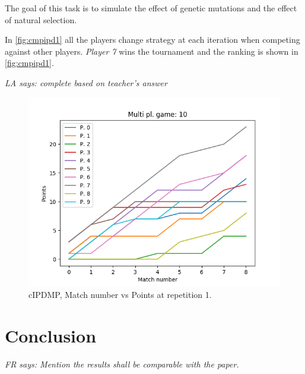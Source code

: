 \documentclass[journal,a4paper,10pt,twoside]{IEEEtran}
\newcommand{\FR}[1]{\textit{\color{ForestGreen}FR says: #1}}
\newcommand{\LA}[1]{\textit{\color{orange}LA says: #1}}
\begin{document}
The goal of this task is to simulate the effect of genetic mutations and the effect of natural selection.

In \autoref{fig:cmpipd1} all the players change strategy at each iteration when competing against other players. \textit{Player 7} wins the tournament and the ranking is shown in \autoref{fig:cmpipd1}.

\LA{complete based on teacher's answer}

\begin{figure}[ht]
    \centering
    \includegraphics[width=1\columnwidth]{../img_v1/cidpmp-scores-10.png}
    \caption{cIPDMP, Match number vs Points at repetition 1.}
    \label{fig:cmpipd1}
\end{figure}

\section{Conclusion} \label{s:conc}

\FR{Mention the results shall be comparable with the paper.}

%
%
\end{document}
